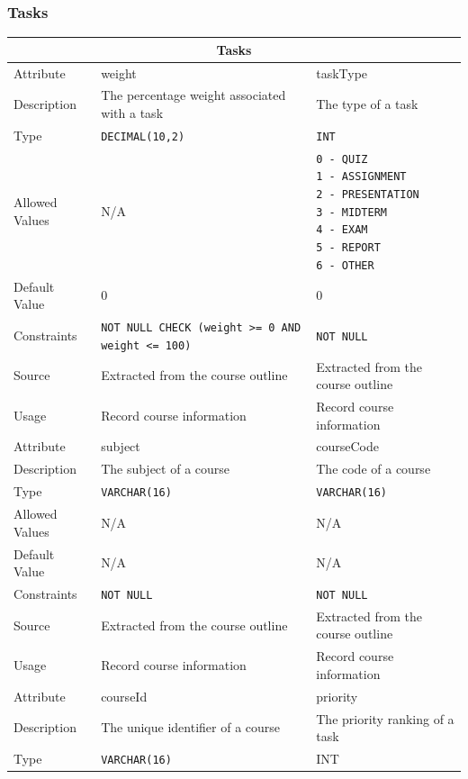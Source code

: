 \documentclass[12pt]{article}
\begin{document}
\subsubsection{Tasks}
\begin{longtable}[H]{ |p{3cm}|p{5cm}|p{5cm}|  }
\hline
\multicolumn{3}{|c|}{Tasks} \\
\hline
Attribute & weight & taskType\\
\hline
Description & The percentage weight associated with a task & The type of a task\\
\hline
Type & \texttt{DECIMAL(10,2)}& \texttt{INT}\\
\hline
Allowed Values &N/A & \parbox{5cm}{\texttt{0 - QUIZ}\\ \texttt{1 - ASSIGNMENT}\\ \texttt{2 - PRESENTATION}\\ \texttt{3 - MIDTERM}\\ \texttt{4 - EXAM}\\ \texttt{5 - REPORT}\\ \texttt{6 - OTHER}} \\
\hline
Default Value & 0& 0\\
\hline
Constraints & \texttt{NOT NULL CHECK (weight >= 0 AND weight <= 100)}& \texttt{NOT NULL}\\
\hline
Source & Extracted from the course outline & Extracted from the course outline \\
\hline
Usage & Record course information  & Record course information \\
\hline
Attribute & subject & courseCode\\
\hline
Description & The subject of a course& The code of a course\\
\hline
Type & \texttt{VARCHAR(16)}& \texttt{VARCHAR(16)}\\
\hline
Allowed Values &N/A &N/A\\
\hline
Default Value &N/A &N/A\\
\hline
Constraints & \texttt{NOT NULL}& \texttt{NOT NULL}\\
\hline
Source & Extracted from the course outline & Extracted from the course outline\\
\hline
Usage & Record course information & Record course information\\
\hline
Attribute & courseId&priority\\
\hline
Description & The unique identifier of a course & The priority ranking of a task\\
\hline
Type & \texttt{VARCHAR(16)}&INT\\

\end{longtable}
\end{document}
